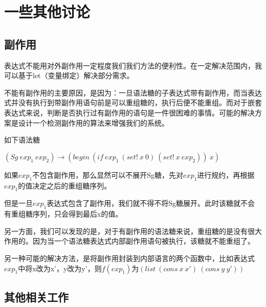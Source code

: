 \section{一些其他讨论}



\subsection{副作用}

表达式不能用对外副作用一定程度我们我们方法的便利性。在一定解决范围内，我可以基于let（变量绑定）解决部分需求。

不能有副作用的主要原因，是因为：一旦语法糖的子表达式带有副作用，而当表达式并没有执行到带副作用语句前是可以重组糖的，执行后便不能重组。而对于嵌套表达式来说，判断是否执行过有副作用的语句是一件很困难的事情。可能的解决方案是设计一个检测副作用的算法来增强我们的系统。

如下语法糖

$(Sg~exp_{1}~exp_{2})→(begin~(if~exp_{1}~(set!~x~0)~(set!~x~exp_{2}))~x)$

如果$exp_{1}$不包含副作用，那么显然可以不展开Sg糖，先对$exp_{1}$进行规约，再根据$exp_{1}$的值决定之后的重组糖序列。

但是一旦$exp_{1}$表达式包含了副作用，我们就不得不将Sg糖展开。此时该糖就不会有重组糖序列，只会得到最后x的值。

另一方面，我们可以发现的是，对于有副作用的语法糖来说，重组糖的是没有很大作用的。因为当一个语法糖表达式内部副作用语句被执行，该糖就不能重组了。

另一种可能的解决方法，是将副作用封装到内部语言的两个函数中，比如表达式$exp_{1}$中将x改为x'，y改为y'，则$f(exp_{1})$为$(list~(cons~x~x')~(cons~y~y'))$

\subsection{其他相关工作}

